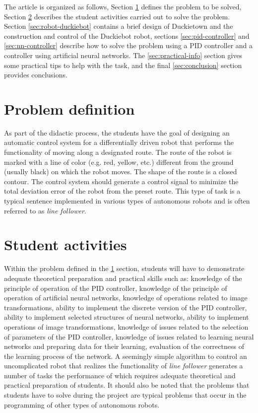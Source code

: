 \documentclass[conference]{IEEEtran}
\begin{document}
The article is organized as follows, Section \ref{sec:problem-definition} defines the problem to be solved, Section \ref{sec:student-activity} describes the student activities carried out to solve the problem. Section \ref{sec:robot-duckiebot} contains a brief design of Duckietown and the construction and control of the Duckiebot robot, sections \ref{sec:pid-controller} and \ref{sec:nn-controller} describe how to solve the problem using a PID controller and a controller using artificial neural networks. The \ref{sec:practical-info} section gives some practical tips to help with the task, and the final \ref{sec:conclusion} section provides conclusions.


\section{Problem definition}\label{sec:problem-definition}
As part of the didactic process, the students have the goal of designing an automatic control system for a differentially driven robot that performs the functionality of moving along a designated route. The route of the robot is marked with a line of color (e.g. red, yellow, etc.) different from the ground (usually black) on which the robot moves. The shape of the route is a closed contour. The control system should generate a control signal to minimize the total deviation error of the robot from the preset route.  This type of task is a typical sentence implemented in various types of autonomous robots and is often referred to as \emph{line follower}.  


\section{Student activities}\label{sec:student-activity}
Within the problem defined in the \ref{sec:problem-definition} section, students will have to demonstrate adequate theoretical preparation and practical skills such as: knowledge of the principle of operation of the PID controller, knowledge of the principle of operation of artificial neural networks, knowledge of operations related to image transformations, ability to implement the discrete version of the PID controller, ability to implement selected structures of neural networks, ability to implement operations of image transformations, knowledge of issues related to the selection of parameters of the PID controller, knowledge of issues related to learning neural networks and preparing data for their learning, evaluation of the correctness of the learning process of the network. A seemingly simple algorithm to control an uncomplicated robot that realizes the functionality of \emph{line follower} generates a number of tasks the performance of which requires adequate theoretical and practical preparation of students. It should also be noted that the problems that students have to solve during the project are typical problems that occur in the programming of other types of autonomous robots.
\end{document}
